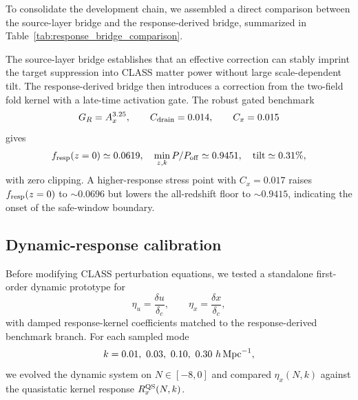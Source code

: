 ﻿\documentclass[11pt,prd,preprint,nofootinbib,amsmath,amssymb]{revtex4-2}
\begin{document}
To consolidate the development chain, we assembled a direct comparison between
the source-layer bridge and the response-derived bridge, summarized in
Table~\ref{tab:response_bridge_comparison}.


The source-layer bridge establishes that an effective correction can stably
imprint the target suppression into CLASS matter power without large
scale-dependent tilt. The response-derived bridge then introduces a correction
from the two-field fold kernel with a late-time activation gate. The robust
gated benchmark
\begin{equation}
G_R=A_x^{3.25},\qquad
C_{\rm drain}=0.014,\qquad
C_x=0.015
\end{equation}
gives
\begin{equation}
f_{\rm resp}(z=0)\simeq0.0619,\quad
\min_{z,k}P/P_{\mathrm{off}}\simeq0.9451,\quad
\mathrm{tilt}\simeq0.31\%,
\end{equation}
with zero clipping. A higher-response stress point with $C_x=0.017$ raises $f_{\rm resp}(z=0)$ to $\sim0.0696$ but lowers the all-redshift floor to $\sim0.9415$, indicating the onset of the safe-window boundary.

\subsection{Dynamic-response calibration}

Before modifying CLASS perturbation equations, we tested a standalone first-order dynamic prototype for
\begin{equation}
\eta_u=\frac{\delta u}{\delta_c},
\qquad
\eta_x=\frac{\delta x}{\delta_c},
\end{equation}
with damped response-kernel coefficients matched to the response-derived
benchmark branch. For each sampled mode
\begin{equation}
k=0.01,\ 0.03,\ 0.10,\ 0.30\ h\,{\rm Mpc}^{-1},
\end{equation}
we evolved the dynamic system on $N\in[-8,0]$ and compared $\eta_x(N,k)$ against the quasistatic kernel response $R_x^{\rm QS}(N,k)$.
\end{document}
